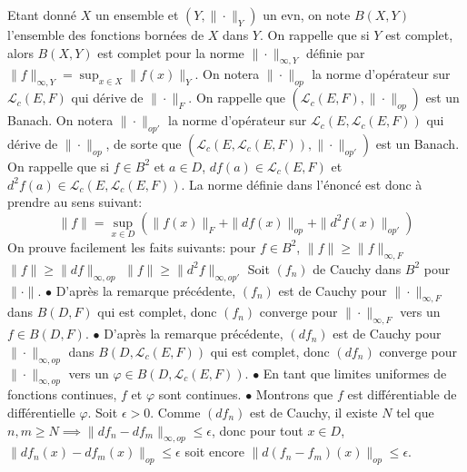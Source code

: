 \documentclass{fancybook}
\begin{document}
Etant donné $X$ un ensemble et $(Y,\|\cdot\|_Y)$ un evn, on note $B(X,Y)$ l'ensemble des fonctions bornées de $X$ dans $Y$. On rappelle que si $Y$ est complet, alors $B(X,Y)$ est complet pour la norme $\|\cdot\|_{\infty,Y}$ définie par $\|f\|_{\infty,Y}=\sup_{x\in X}\|f(x)\|_Y$.\newline \newline
On notera $\|\cdot\|_{op}$ la norme d'opérateur sur $\mathcal L_c(E,F)$ qui dérive de $\|\cdot\|_F$. On rappelle que $(\mathcal L_c(E,F),\|\cdot\|_{op})$ est un Banach.\newline \newline
On notera $\|\cdot\|_{op'}$ la norme d'opérateur sur $\mathcal L_c(E,\mathcal L_c(E,F))$ qui dérive de $\|\cdot\|_{op}$, de sorte que $(\mathcal L_c(E,\mathcal L_c(E,F)),\|\cdot\|_{op'})$ est un Banach.\newline \newline
On rappelle que si $f\in B^2$ et $a\in D$, $df(a)\in \mathcal L_c(E,F)$ et $d^2f(a) \in \mathcal L_c(E,\mathcal L_c(E,F))$. La norme définie dans l'énoncé est donc à prendre au sens suivant: $$\|f\| = \sup_{x\in D}( \|f(x)\|_F + \|df(x)\|_{op} + \|d^2f(x)\|_{op'})$$ 
On prouve facilement les faits suivants: pour $f\in B^2$, \newline
$\|f\|\geq \|f\|_{\infty, F}$ \newline
$\|f\|\geq \|df\|_{\infty, op}$ \newline
$\|f\|\geq \|d^2f\|_{\infty, op'}$ \newline 
\newline
Soit $(f_n)$ de Cauchy dans $B^2$ pour $\|\cdot \|$.\newline
$\bullet$ D'après la remarque précédente, $(f_n)$ est de Cauchy pour $\|\cdot\|_{\infty, F}$ dans $B(D,F)$ qui est complet, donc $(f_n)$ converge pour $\|\cdot\|_{\infty, F}$ vers un $f\in B(D,F)$.\newline
$\bullet$ D'après la remarque précédente, $(df_n)$ est de Cauchy pour $\|\cdot\|_{\infty, op}$ dans $B(D,\mathcal L_c(E,F))$ qui est complet, donc $(df_n)$ converge pour $\|\cdot\|_{\infty, op}$ vers un $\varphi\in B(D,\mathcal L_c(E,F))$.\newline
$\bullet$ En tant que limites uniformes de fonctions continues, $f$ et $\varphi$ sont continues.\newline
$\bullet$ Montrons que $f$ est différentiable de différentielle $\varphi$.\newline
Soit $\epsilon >0$. Comme $(df_n)$ est de Cauchy, il existe $N$ tel que $n,m\geq N \implies \|df_n - df_m\|_{\infty, op}\leq \epsilon$, donc pour tout $x\in D$, $\|df_n(x) - df_m(x)\|_{op}\leq \epsilon$ soit encore $\|d(f_n-f_m)(x)\|_{op}\leq \epsilon$.\newline
\end{document}
